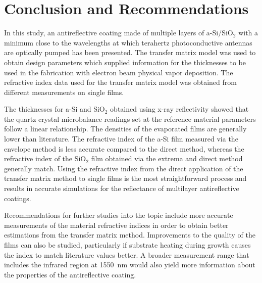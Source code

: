 
\chapter{Conclusion and Recommendations}

In this study, an antireflective coating made of multiple layers of a-Si/SiO$_2$ with a minimum close to the wavelengths at which terahertz photoconductive antennas are optically pumped has been presented. The transfer matrix model was used to obtain design parameters which supplied information for the thicknesses to be used in the fabrication with electron beam physical vapor deposition. The refractive index data used for the transfer matrix model was obtained from different measurements on single films.

The thicknesses for a-Si and SiO$_2$ obtained using x-ray reflectivity showed that the quartz crystal microbalance readings set at the reference material parameters follow a linear relationship. The densities of the evaporated films are generally lower than literature. The refractive index of the a-Si film measured via the envelope method is less accurate compared to the direct method, whereas the refractive index of the SiO$_2$ film obtained via the extrema and direct method generally match. Using the refractive index from the direct application of the transfer matrix method to single films is the most straightforward process and results in accurate simulations for the reflectance of multilayer antireflective coatings.

Recommendations for further studies into the topic include more accurate measurements of the material refractive indices in order to obtain better estimations from the transfer matrix method. Improvements to the quality of the films can also be studied, particularly if substrate heating during growth causes the index to match literature values better. A broader measurement range that includes the infrared region at \qty{1550}{\nano\meter} would also yield more information about the properties of the antireflective coating.

